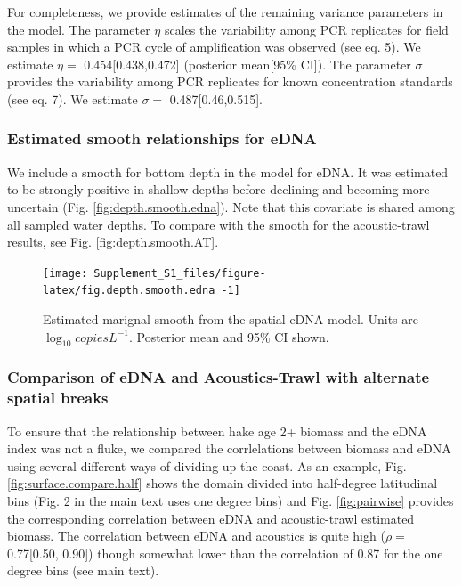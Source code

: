 \documentclass[
]{article}
\begin{document}
For completeness, we provide estimates of the remaining variance
parameters in the model. The parameter \(\eta\) scales the variability
among PCR replicates for field samples in which a PCR cycle of
amplification was observed (see eq. 5). We estimate \(\eta =\)
0.454{[}0.438,0.472{]} (posterior mean{[}95\% CI{]}). The parameter
\(\sigma\) provides the variability among PCR replicates for known
concentration standards (see eq. 7). We estimate \(\sigma=\)
0.487{[}0.46,0.515{]}.

\hypertarget{estimated-smooth-relationships-for-edna}{%
\subsubsection{Estimated smooth relationships for
eDNA}\label{estimated-smooth-relationships-for-edna}}

We include a smooth for bottom depth in the model for eDNA. It was
estimated to be strongly positive in shallow depths before declining and
becoming more uncertain (Fig. \ref{fig:depth.smooth.edna}). Note that
this covariate is shared among all sampled water depths. To compare with
the smooth for the acoustic-trawl results, see Fig.
\ref{fig:depth.smooth.AT}.

\begin{figure}
\texttt{[image: Supplement\_S1\_files/figure-latex/fig.depth.smooth.edna -1]} \caption{\label{fig:depth.smooth.edna} Estimated marignal smooth from the spatial eDNA model.  Units are \(\log_{10} copies L^{-1}\).  Posterior mean and 95\% CI shown.}\label{fig:fig.depth.smooth.edna }
\end{figure}

\hypertarget{comparison-of-edna-and-acoustics-trawl-with-alternate-spatial-breaks}{%
\subsubsection{Comparison of eDNA and Acoustics-Trawl with alternate
spatial
breaks}\label{comparison-of-edna-and-acoustics-trawl-with-alternate-spatial-breaks}}

To ensure that the relationship between hake age 2+ biomass and the eDNA
index was not a fluke, we compared the corrlelations between biomass and
eDNA using several different ways of dividing up the coast. As an
example, Fig. \ref{fig:surface.compare.half} shows the domain divided
into half-degree latitudinal bins (Fig. 2 in the main text uses one
degree bins) and Fig. \ref{fig:pairwise} provides the corresponding
correlation between eDNA and acoustic-trawl estimated biomass. The
correlation between eDNA and acoustics is quite high (\(\rho =\)
0.77{[}0.50, 0.90{]}) though somewhat lower than the correlation of 0.87
for the one degree bins (see main text).
\end{document}
